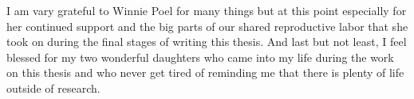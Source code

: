\begin{minipage}[t][0pt]{\linewidth}
 I am vary grateful to Winnie Poel for many things but at this point especially for her continued support and the big parts of our shared reproductive labor that she took on during the final stages of writing this thesis.
And last but not least, I feel blessed for my two wonderful daughters who came into my life during the work on this thesis and who never get tired of reminding me that there is plenty of life outside of research.
\end{minipage}
